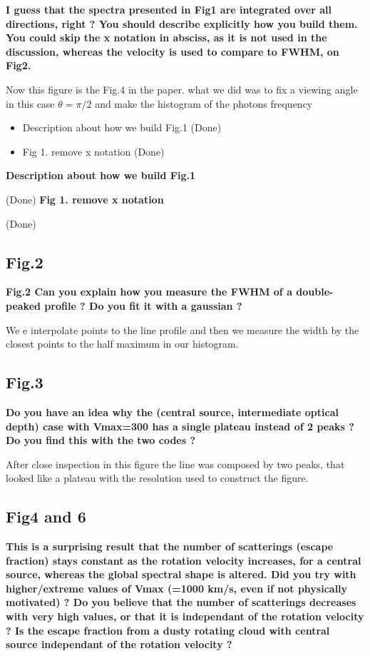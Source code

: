 \documentclass[12pt]{article}
\begin{document}
{\bf I guess that the spectra presented in Fig1 are integrated over all directions, right ? You should describe explicitly how you build them. You could skip the x notation in absciss, as it is not used in the discussion, whereas the velocity is used to compare to FWHM, on Fig2.}

Now this figure is the Fig.4 in the paper. what we did was to fix a viewing angle in this case $\theta= \pi/2$ and make the histogram of the photons frequency

\begin{itemize}
\item Description about how we build Fig.1 (Done)
\item Fig 1. remove x notation (Done)
\end{itemize}


{\bf Description about how we build Fig.1}

 (Done)
{\bf Fig 1. remove x notation} 

(Done)

\subsection*{Fig.2}

{\bf Fig.2 Can you explain how you measure the FWHM of a double-peaked profile ? Do you fit it with a gaussian ?}


We e interpolate points to the line profile and then  we measure the
width by  the closest points to the half maximum in our histogram. 


\subsection*{Fig.3}

{\bf Do you have an idea why the (central source, intermediate optical depth) case with Vmax=300 has a single plateau instead of 2 peaks ? Do you find this with the two codes ?}

After close inspection in this figure the line was composed by two
peaks, that looked like a plateau with the resolution used to
construct the figure.


\subsection*{Fig4 and 6}

{\bf This is a surprising result that the number of scatterings (escape fraction) stays constant as the rotation velocity increases, for a central source, whereas the global spectral shape is altered. Did you try with higher/extreme values of Vmax (=1000 km/s, even if not physically motivated) ? Do you believe that the number of scatterings decreases with very high values, or that it is independant of the rotation velocity ? Is the escape fraction from a dusty rotating cloud with central source independant of the rotation velocity ?}
\end{document}
